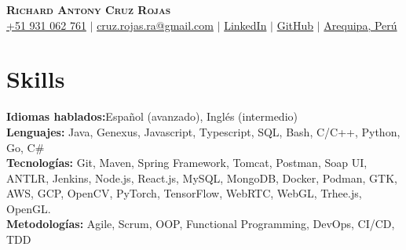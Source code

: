 \documentclass[letterpaper,11pt]{article}
\newcommand{\resumeSubHeadingListStart}{\begin{itemize}[leftmargin=0.15in, label={}]}
\newcommand{\resumeSubHeadingListEnd}{\end{itemize}}
\begin{document}

\begin{center}
    \textbf{\Huge \scshape Richard Antony Cruz Rojas} \\ \vspace{3pt}
    \small
    \faMobile \hspace{.5pt} \href{tel:51931062761}{+51 931 062 761}
    $|$
    \faAt \hspace{.5pt} \href{mailto:cruz.rojas.ra@gmail.com}{cruz.rojas.ra@gmail.com}
    $|$
    \faLinkedinSquare \hspace{.5pt} \href{https://www.linkedin.com/in/richard-antony-cruz-rojas/}{LinkedIn}
    $|$
    \faGithub \hspace{.5pt} \href{https://github.com/ricktonycr}{GitHub}
    $|$
    \faMapMarker \hspace{.5pt} \href{https://www.google.com/maps/place/Arequipa/@-16.4040524,-71.5390115,14z/data=!3m1!4b1!4m6!3m5!1s0x91424a487785b9b3:0xa3c4a612b9942036!8m2!3d-16.4090474!4d-71.537451!16zL20vMDFweTg3?entry=ttu}{Arequipa, Perú}
\end{center}




\section{Skills}
  \vspace{2pt}
  \resumeSubHeadingListStart
    \small{\item{
        \textbf{Idiomas hablados:}{Español (avanzado), Inglés (intermedio)} \\ \vspace{3pt}
        \textbf{Lenguajes:}{ Java, Genexus, Javascript, Typescript, SQL, Bash, C/C++, Python, Go, C\#} \\ \vspace{3pt}
        \textbf{Tecnologías:}{ Git, Maven, Spring Framework, Tomcat, Postman, Soap UI, ANTLR, Jenkins, Node.js, React.js, MySQL, MongoDB, Docker, Podman, GTK, AWS, GCP, OpenCV, PyTorch, TensorFlow, WebRTC, WebGL, Trhee.js, OpenGL.} \\ \vspace{3pt}
        \textbf{Metodologías:}{ Agile, Scrum, OOP, Functional Programming, DevOps, CI/CD, TDD} \\ \vspace{3pt}
    }}
  \resumeSubHeadingListEnd
\end{document}

